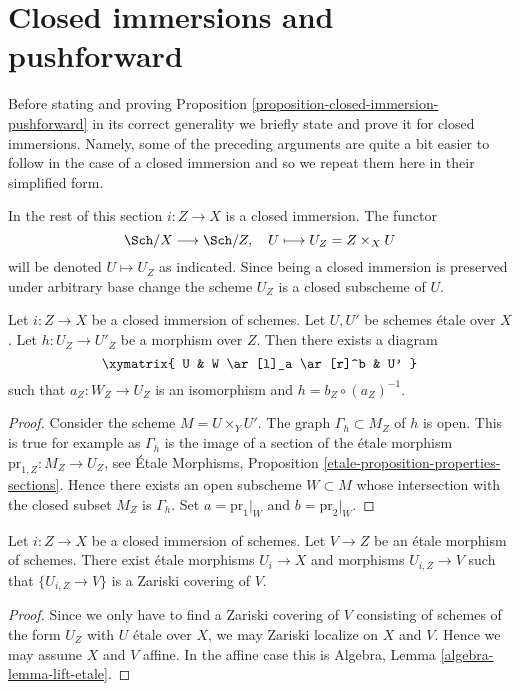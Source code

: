 \section{Closed immersions and pushforward}
\label{section-closed-immersions}

\noindent
Before stating and proving
Proposition \ref{proposition-closed-immersion-pushforward}
in its correct generality we briefly state and prove it for
closed immersions. Namely, some of the preceding arguments
are quite a bit easier to follow in the case of a closed immersion and
so we repeat them here in their simplified form.

\medskip\noindent
In the rest of this section $i : Z \to X$ is a closed immersion.
The functor
$$
\Sch/X \longrightarrow \Sch/Z, \quad
U \longmapsto U_Z = Z \times_X U
$$
will be denoted $U \mapsto U_Z$ as indicated. Since being a closed immersion
is preserved under arbitrary base change the scheme $U_Z$ is a closed subscheme
of $U$.

\begin{lemma}
\label{lemma-closed-immersion-almost-full}
Let $i : Z \to X$ be a closed immersion of schemes.
Let $U, U'$ be schemes \'etale over $X$. Let $h : U_Z \to U'_Z$
be a morphism over $Z$. Then there exists a diagram
$$
\xymatrix{
U & W \ar[l]_a \ar[r]^b & U'
}
$$
such that $a_Z : W_Z \to U_Z$ is an isomorphism and $h = b_Z \circ (a_Z)^{-1}$.
\end{lemma}

\begin{proof}
Consider the scheme $M = U \times_Y U'$. The graph $\Gamma_h \subset M_Z$
of $h$ is open. This is true for example as $\Gamma_h$ is the image of a
section of the \'etale morphism $\text{pr}_{1, Z} : M_Z \to U_Z$, see
\'Etale Morphisms, Proposition \ref{etale-proposition-properties-sections}.
Hence there exists an open subscheme $W \subset M$ whose intersection with
the closed subset $M_Z$ is $\Gamma_h$. Set $a = \text{pr}_1|_W$
and $b = \text{pr}_2|_W$.
\end{proof}

\begin{lemma}
\label{lemma-closed-immersion-almost-essentially-surjective}
Let $i : Z \to X$ be a closed immersion of schemes.
Let $V \to Z$ be an \'etale morphism of schemes.
There exist \'etale morphisms $U_i \to X$ and morphisms
$U_{i, Z} \to V$ such that $\{U_{i, Z} \to V\}$
is a Zariski covering of $V$.
\end{lemma}

\begin{proof}
Since we only have to find a Zariski covering of $V$ consisting of schemes
of the form $U_Z$ with $U$ \'etale over $X$, we may Zariski localize on $X$
and $V$. Hence we may assume $X$ and $V$ affine. In the affine case this is
Algebra, Lemma \ref{algebra-lemma-lift-etale}.
\end{proof}

